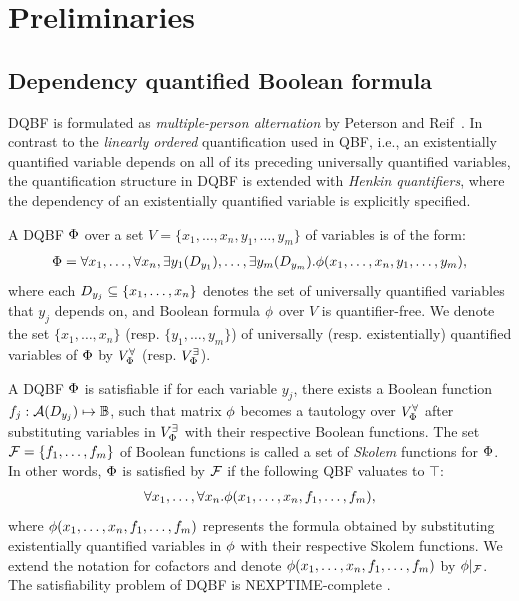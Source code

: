 \section{Preliminaries}
\label{sect:dssat-preliminaries}

\subsection{Dependency quantified Boolean formula}
\label{sect:dssat-dqbf}
DQBF is formulated as \textit{multiple-person alternation} by Peterson and Reif~\cite{Peterson1979}.
In contrast to the \textit{linearly ordered} quantification used in QBF,
i.e., an existentially quantified variable depends on all of its preceding universally quantified variables,
the quantification structure in DQBF is extended with \textit{Henkin quantifiers},
where the dependency of an existentially quantified variable is explicitly specified.

A DQBF $\Phi$ over a set $V=\{x_1,\ldots,x_n,y_1,\ldots,y_m\}$ of variables is of the form:
\begin{align*}
    \Phi=\forall x_1,\ldots,\forall x_n,\exists y_1(D_{y_1}),\ldots,\exists y_m(D_{y_m}).\phi(x_1,\ldots,x_n,y_1,\ldots,y_m),
\end{align*}
where each $D_{y_j}\subseteq\{x_1,\ldots,x_n\}$ denotes the set of universally quantified variables that $y_j$ depends on,
and Boolean formula $\phi$ over $V$ is quantifier-free.
We denote the set $\{x_1,\ldots,x_n\}$ (resp. $\{y_1,\ldots,y_m\}$) of universally (resp. existentially) quantified variables of $\Phi$ by $V_{\Phi}^{\forall}$ (resp. $V_{\Phi}^{\exists}$).

A DQBF $\Phi$ is satisfiable if for each variable $y_j$,
there exists a Boolean function $f_j:\mathcal{A}(D_{y_j})\mapsto\mathbb{B}$,
such that matrix $\phi$ becomes a tautology over $V_{\Phi}^{\forall}$
after substituting variables in $V_{\Phi}^{\exists}$ with their respective Boolean functions.
The set $\mathcal{F}=\{f_1,\ldots,f_m\}$ of Boolean functions is called a set of \textit{Skolem} functions for $\Phi$.
In other words, $\Phi$ is satisfied by $\mathcal{F}$ if the following QBF valuates to $\top$:
\begin{align}
    \label{eq:dssat-dqbf-satisfiable}
    \forall x_1,\ldots,\forall x_n.\phi(x_1,\ldots,x_n,f_1,\ldots,f_m),
\end{align}
where $\phi(x_1,\ldots,x_n,f_1,\ldots,f_m)$ represents the formula obtained by substituting existentially quantified variables in $\phi$ with their respective Skolem functions.
We extend the notation for cofactors and denote $\phi(x_1,\ldots,x_n,f_1,\ldots,f_m)$ by $\phi|_{\mathcal{F}}$.
The satisfiability problem of DQBF is NEXPTIME-complete \cite{Peterson2001}.

